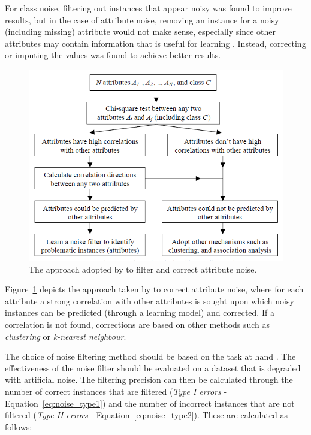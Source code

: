 For class noise, filtering out instances that appear noisy was found to improve results, but in the case of attribute noise, removing an instance for a noisy (including missing) attribute would not make sense, especially since other attributes may contain information that is useful for learning \citep{zhu2004class}.  Instead, correcting or imputing the values was found to achieve better results. 

\begin{figure}
  \includegraphics{graphics/noise_in_datasets/noise_imputation.png}
  \caption{The approach adopted by \citet{zhu2004class} to filter and correct attribute noise.}
  \label{fig:noise_imputation}
\end{figure}

Figure~\ref{fig:noise_imputation} depicts the approach taken by \citet{zhu2004class} to correct attribute noise, where for each attribute a strong correlation with other attributes is sought upon which noisy instances can be predicted (through a learning model) and corrected.  If a correlation is not found, corrections are based on other methods such as \textit{clustering} or \textit{k-nearest neighbour}.

The choice of noise filtering method should be based on the task at hand \citep{frenay2014classification}. The effectiveness of the noise filter should be evaluated on a dataset that is degraded with artificial noise.  The filtering precision can then be calculated through the number of correct instances that are filtered (\textit{Type I errors} - Equation~\ref{eq:noise_type1}) and the number of incorrect instances that are not filtered (\textit{Type II errors} - Equation~\ref{eq:noise_type2}).  These are calculated as follows: 

